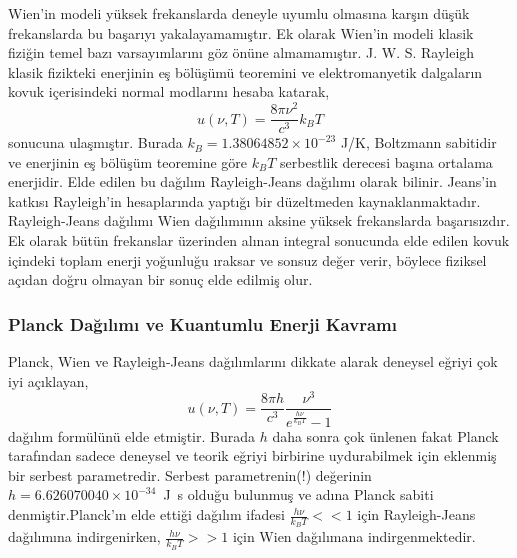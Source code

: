 \documentclass[a4paper,12pt, twoside]{article}
\begin{document}
Wien'in modeli yüksek frekanslarda deneyle uyumlu olmasına karşın düşük frekanslarda bu başarıyı yakalayamamıştır. Ek olarak Wien'in modeli klasik fiziğin temel bazı varsayımlarını göz önüne almamamıştır. J. W. S. Rayleigh klasik fizikteki enerjinin eş bölüşümü teoremini ve elektromanyetik dalgaların kovuk içerisindeki normal modlarını hesaba katarak,
%
\begin{equation}
\label{eq:Rayleigh}
u(\nu, T) = \frac{8 \pi \nu^{2}}{c^{3}} k_{B} T
\end{equation}
sonucuna ulaşmıştır. Burada $k_B = 1.38064852 \times 10^{-23}$ J/K, Boltzmann sabitidir ve enerjinin eş bölüşüm teoremine göre $k_B T$ serbestlik derecesi başına ortalama enerjidir. Elde edilen bu dağılım Rayleigh-Jeans dağılımı olarak bilinir. Jeans'in katkısı Rayleigh'in hesaplarında yaptığı bir düzeltmeden kaynaklanmaktadır. Rayleigh-Jeans dağılımı Wien dağılımının aksine yüksek frekanslarda başarısızdır. Ek olarak bütün frekanslar üzerinden alınan integral sonucunda elde edilen kovuk içindeki toplam enerji yoğunluğu ıraksar ve sonsuz değer verir, böylece fiziksel açıdan doğru olmayan bir sonuç elde edilmiş olur.






\subsubsection{Planck Dağılımı ve Kuantumlu Enerji Kavramı}

Planck, Wien ve Rayleigh-Jeans dağılımlarını dikkate alarak deneysel eğriyi çok iyi açıklayan,
\begin{equation}
\label{eq:Planck}
u(\nu, T) = \frac{8 \pi h}{c^{3}} \frac{\nu^{3}}{e^{\frac{h \nu}{k_{B} T}} - 1}
\end{equation} 
dağılım formülünü elde etmiştir. Burada $h$ daha sonra çok ünlenen fakat Planck tarafından sadece deneysel ve teorik eğriyi birbirine uydurabilmek için eklenmiş bir serbest parametredir. Serbest parametrenin(!) değerinin $h=6.626070040 \times 10^{-34}$~J~s olduğu bulunmuş ve adına Planck sabiti denmiştir.Planck'ın elde ettiği dağılım ifadesi $\frac{h\nu}{k_B T}<<1$ için Rayleigh-Jeans dağılımına indirgenirken, $\frac{h\nu}{k_B T}>>1$ için Wien dağılımana indirgenmektedir.
\end{document}
